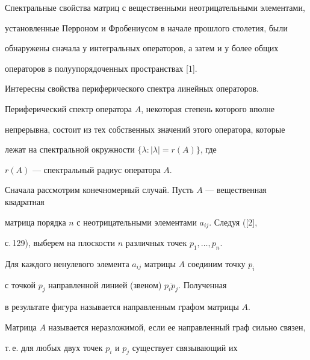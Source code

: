 \pagestyle{plain} %







\maketitle


\label{begin}








Спектральные свойства матриц с вещественными неотрицательными элементами,


установленные Перроном и Фробениусом в начале прошлого столетия, были


обнаружены сначала у интегральных операторов, а затем и у более общих


операторов в полуупорядоченных пространствах [1].





Интересны свойства периферического спектра линейных операторов.


Периферический спектр оператора $A$, некоторая степень которого вполне


непрерывна, состоит из тех собственных значений этого оператора, которые


лежат на спектральной окружности $\{\lambda : |\lambda | = r(A)\}$, где


$r(A)$ --- спектральный радиус оператора $A$.





Сначала рассмотрим конечномерный случай. Пусть $A$ --- вещественная квадратная


матрица порядка $n$ с неотрицательными элементами $a_{ij}$. Следуя ([2],


с.\,129), выберем на плоскости $n$ различных точек $p_1,\dotsc,p_n$.


Для каждого ненулевого элемента $a_{ij}$ матрицы $A$ соединим точку $p_i$


с точкой $p_j$ направленной линией (звеном) $\overline{p_i p_j}$. Полученная


в результате фигура называется направленным графом матрицы $A$.


Матрица $A$ называется неразложимой, если ее направленный граф сильно связен,


т.\,е. для любых двух точек $p_i$ и $p_j$ существует связывающий их 


